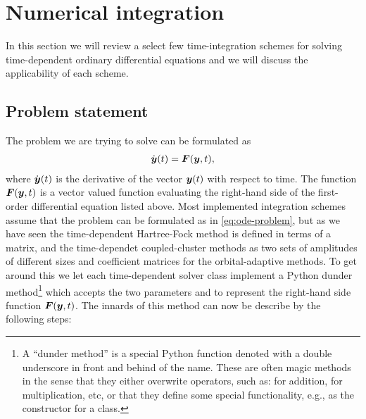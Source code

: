     \section{Numerical integration}
        \label{sec:numerical-integration}
        In this section we will review a select few time-integration schemes for
        solving time-dependent ordinary differential equations and we will discuss the
        applicability of each scheme.

        \subsection{Problem statement}
            The problem we are trying to solve can be formulated as
            \begin{align}
                \dot{\boldsymbol{y}}(t) = \boldsymbol{F}(\boldsymbol{y}, t),
                \label{eq:ode-problem}
            \end{align}
            where $\dot{\boldsymbol{y}}(t)$ is the derivative of the vector
            $\boldsymbol{y}(t)$ with respect to time.
            The function $\boldsymbol{F}(\boldsymbol{y}, t)$ is a vector valued function
            evaluating the right-hand side of the first-order differential
            equation listed above.
            Most implemented integration schemes assume that the problem can
            be formulated as in \autoref{eq:ode-problem}, but as we have seen the
            time-dependent Hartree-Fock method is defined in terms of a matrix,
            and the time-dependet coupled-cluster methods as two sets of
            amplitudes of different sizes and coefficient matrices for the
            orbital-adaptive methods.
            To get around this we let each time-dependent solver class implement
            a Python dunder method\footnote{%
                A ``dunder method'' is a special Python function denoted with a
                double underscore in front and behind of the name.
                These are often magic methods in the sense that they either
                overwrite operators, such as:  for addition,
                 for multiplication, etc, or that they define some
                special functionality, e.g.,  as the constructor
                for a class.
            }  which accepts the two
            parameters  and  to represent the right-hand side
            function $\boldsymbol{F}(\boldsymbol{y}, t)$.
            The innards of this method can now be describe by the following
            steps:
